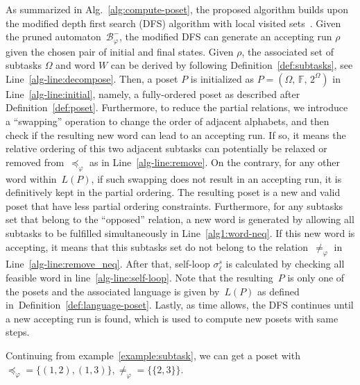 As summarized in Alg.~\ref{alg:compute-poset},
the proposed algorithm builds upon the modified depth first search (DFS)
algorithm with local visited sets~\cite{sedgewick2001algorithms}.
Given the pruned automaton~$\mathcal{B}_{\varphi}^-$,
the modified DFS can generate an accepting run $\rho$ given the chosen pair of
initial and final states.
Given $\rho$, the associated set of subtasks $\Omega$ and word $W$ can be
derived by following Definition~\ref{def:subtasks}, see Line~\ref{alg-line:decompose}.
Then, a poset $P$ is initialized as $P=(\Omega,\, \mathbb{F},\, 2^{\Omega})$
in Line~\ref{alg-line:initial},
namely, a fully-ordered poset as described after Definition~\ref{def:poset}.
Furthermore, to reduce the partial relations,
we introduce a ``swapping'' operation to change the order of adjacent alphabets,
and then check if the resulting new word can lead to an accepting run.
If so, it means the relative ordering of this two adjacent subtasks can
potentially be relaxed or removed from~$\preceq_{\varphi}$ as in Line~\ref{alg-line:remove}.
On the contrary, for any other word within~$L(P)$, if such swapping does not
result in an accepting run, it is definitively kept in the partial ordering.
The resulting poset is a new and valid poset that have less partial
ordering constraints.
Furthermore, for any subtasks set that belong to the ``opposed'' relation,
a new word is generated by allowing all subtasks to be fulfilled simultaneously
in Line~\ref{alg1:word-neq}. 
If this new word is accepting, it means that this subtasks set do not belong to the
relation~$\neq_{\varphi}$ in Line~\ref{alg-line:remove_neq}. After that, self-loop $\sigma^s_\ell$ is calculated
by checking all feasible word in line~\ref{alg-line:self-loop}.
Note that the resulting~$P$ is only one of the posets and the associated language is
given by~$L(P)$ as defined in~Definition~\ref{def:language-poset}.
Lastly, as time allows, the DFS continues until a new accepting run is found,
which is used to compute new posets with same steps.

\begin{example}
	Continuing from example~\ref{example:subtask}, we can get a poset with 
	$\preceq_\varphi=\{(1,2),(1,3)\},\neq_{\varphi}=\{\{2,3\}\}$.
\end{example}

